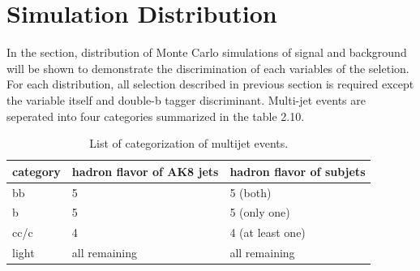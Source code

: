 \section{Simulation Distribution} 
In the section, distribution of Monte Carlo simulations of signal and background will be shown to demonstrate the discrimination of each variables of the seletion. For each distribution, all selection described in previous section is required except the variable itself and double-b tagger discriminant. Multi-jet events are seperated into four categories summarized in the table 2.10. 

\begin{table}[h!]
  \begin{center}
    \begin{tabular}{lll}
    category & hadron flavor of AK8 jets & hadron flavor of subjets \\
    \hline
    bb & 5 & 5 (both) \\
    b & 5 & 5 (only one) \\
    cc/c & 4 & 4 (at least one) \\
    light & all remaining & all remaining \\
	\hline
    \end{tabular}
  \end{center}

  \caption{List of categorization of multijet events.}
\end{table} 

